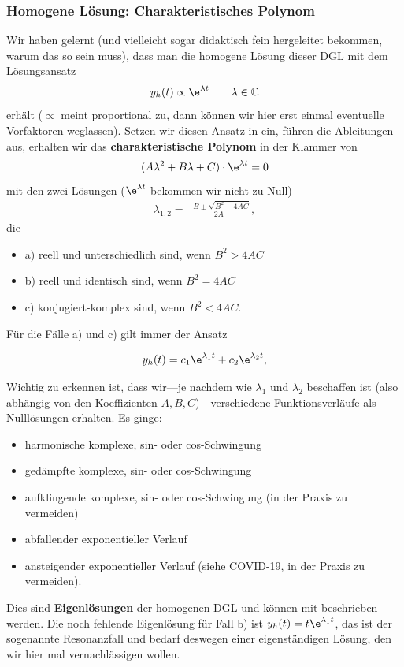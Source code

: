\subsubsection{Homogene Lösung: Charakteristisches Polynom}
%
Wir haben gelernt (und vielleicht sogar didaktisch fein hergeleitet bekommen,
warum das so sein muss), dass man die homogene Lösung dieser DGL mit dem
Lösungsansatz
\begin{equation}
y_h(t) \propto \e^{\lambda t}\qquad \lambda\in\mathbb{C}
\end{equation}
erhält ($\propto$ meint proportional zu, dann können wir hier erst einmal
eventuelle Vorfaktoren weglassen).
%
Setzen wir diesen Ansatz in  ein, führen die Ableitungen
aus, erhalten wir das \textbf{charakteristische Polynom} in der Klammer von
\begin{equation}
(A \lambda^2 + B \lambda + C) \cdot \e^{\lambda t} = 0
\end{equation}
mit den zwei Lösungen ($\e^{\lambda t}$ bekommen wir nicht zu Null)
\begin{align}
\label{eq:A7BEE9E24E_lambdas}
\lambda_{1,2} = \frac{-B \pm \sqrt{B^2-4 A C}}{2 A},
\end{align}
die
\begin{itemize}
  \item a) reell und unterschiedlich sind, wenn $B^2>4 A C$
  \item b) reell und identisch sind, wenn $B^2 = 4 A C$
  \item c) konjugiert-komplex sind, wenn $B^2<4 A C$.
\end{itemize}
%
Für die Fälle a) und c) gilt immer der Ansatz
\begin{mdframed}[backgroundcolor=C3!10]
\begin{align}
\label{eq:A7BEE9E24E_Eigenloesungen}
y_h(t) = c_1 \e^{\lambda_1 t} + c_2 \e^{\lambda_2 t},
\end{align}
\end{mdframed}
%
Wichtig zu erkennen ist, dass wir---je nachdem wie $\lambda_1$ und $\lambda_2$
beschaffen ist (also abhängig von den Koeffizienten $A,B,C$)---verschiedene
Funktionsverläufe als Nulllösungen erhalten.
Es ginge:
\begin{itemize}
  \item harmonische komplexe, sin- oder cos-Schwingung
  \item gedämpfte komplexe, sin- oder cos-Schwingung
  \item aufklingende komplexe, sin- oder cos-Schwingung (in der Praxis zu vermeiden)
  \item abfallender exponentieller Verlauf
  \item ansteigender exponentieller Verlauf (siehe COVID-19, in der Praxis zu vermeiden).
\end{itemize}
Dies sind \textbf{Eigenlösungen} der homogenen DGL und können mit
 beschrieben werden.
%
Die noch fehlende Eigenlösung für Fall b) ist $y_h(t) = t \e^{\lambda_1 t}$, das
ist der sogenannte Resonanzfall und bedarf deswegen einer eigenständigen Lösung,
den wir hier mal vernachlässigen wollen.

